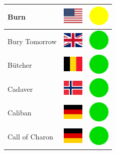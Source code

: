 \documentclass[12pt, a4paper, twoside]{report}
\begin{document}
\begin{center}
\begin{longtable}{|p{5cm}|p{2cm}|p{2cm}|}
 Burn                                                       & \includegraphics[width=1cm]{../4x3/us} &   \includegraphics[width=1cm]{../likes/m} \\ \hline
 Bury Tomorrow                                              & \includegraphics[width=1cm]{../4x3/gb} &   \includegraphics[width=1cm]{../likes/y} \\ \hline
 Bütcher                                                    & \includegraphics[width=1cm]{../4x3/be} &   \includegraphics[width=1cm]{../likes/y} \\ \hline
 Cadaver                                                    & \includegraphics[width=1cm]{../4x3/no} &   \includegraphics[width=1cm]{../likes/y} \\ \hline
 Caliban                                                    & \includegraphics[width=1cm]{../4x3/de} &   \includegraphics[width=1cm]{../likes/y} \\ \hline
 Call of Charon                                             & \includegraphics[width=1cm]{../4x3/de} &   \includegraphics[width=1cm]{../likes/y} \\ \hline

\end{longtable}
\end{center}
\end{document}

